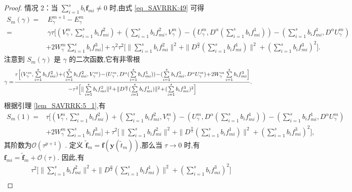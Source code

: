 \begin{proof}
情况 2：当 $\sum\limits_{i=1}^s b_i \bm{f}_{m i} \neq 0$ 时,由式 \eqref{eq_SAVRRK:49} 可得
\begin{align}\label{eq_SAVRRK:5_4a}
	S_m(\gamma)=&~E_{\gamma}^{m+1}-E_{\gamma}^{m}\nonumber\\
	=&~\gamma\tau\Big[(V_{\gamma}^{m},\sum\limits_{i=1}^{s}b_if_{mi}^2)+(\sum\limits_{i=1}^{s}b_if_{mi}^2,V_{\gamma}^{m})-(U_{\gamma}^{m},D^{\alpha} (\sum\limits_{i=1}^{s}b_if_{mi}^1))-(\sum\limits_{i=1}^{s}b_if_{mi}^1, D^{\alpha} U_{\gamma}^{m})\nonumber\\
	&+2W_{\gamma}^{m}\sum\limits_{i=1}^{s}b_if_{mi}^3\Big]+\gamma^2\tau^2\Big[\|\sum\limits_{i=1}^{s}b_if_{mi}^2\|^2+ \|D^\frac{\alpha}{2}(\sum\limits_{i=1}^{s}b_if_{mi}^1)\|^2+(\sum\limits_{i=1}^{s}b_if_{mi}^3)^2\Big].
\end{align}
注意到 $S_m(\gamma)$ 是 $\gamma$ 的二次函数,它有非零根
\begin{equation}\label{eq_SAVRRK:5_4a3}\small
	\gamma=\!\frac{\tau\Big[(V_{\gamma}^{m},\sum\limits_{i=1}^{s}b_if_{mi}^2)\!+\!(\sum\limits_{i=1}^{s}b_if_{mi}^2,V_{\gamma}^{m})\!-\!(U_{\gamma}^{m},D^{\alpha} (\sum\limits_{i=1}^{s}b_if_{mi}^1))\!-\!(\sum\limits_{i=1}^{s}b_if_{mi}^1, D^{\alpha} U_{\gamma}^{m})\!+\!2W_{\gamma}^{m}\sum\limits_{i=1}^{s}b_if_{mi}^3\Big]}{-\tau^2\Big[\|\sum\limits_{i=1}^{s}b_if_{mi}^2\|^2\!+\! \|D^\frac{\alpha}{2}(\sum\limits_{i=1}^{s}b_if_{mi}^1)\|^2\!+\!(\sum\limits_{i=1}^{s}b_if_{mi}^3)^2\Big]}.
\end{equation}
根据引理 \ref{lem_SAVRRK:5_1},有
\begin{align}\label{eq_SAVRRK:5_4a2}
	S_m(1)=&\tau\Big[(V_{\gamma}^{m},\sum\limits_{i=1}^{s}b_if_{mi}^2)+(\sum\limits_{i=1}^{s}b_if_{mi}^2,V_{\gamma}^{m})-(U_{\gamma}^{m},D^{\alpha} (\sum\limits_{i=1}^{s}b_if_{mi}^1))-(\sum\limits_{i=1}^{s}b_if_{mi}^1, D^{\alpha} U_{\gamma}^{m})\nonumber\\
	&+2W_{\gamma}^{m}\sum\limits_{i=1}^{s}b_if_{mi}^3\Big]+\tau^2\Big[\|\sum\limits_{i=1}^{s}b_if_{mi}^2\|^2+ \|D^\frac{\alpha}{2}(\sum\limits_{i=1}^{s}b_if_{mi}^1)\|^2+(\sum\limits_{i=1}^{s}b_if_{mi}^3)^2\Big],
\end{align}
其阶数为$\mathcal{O}(\tau^{p+1})$ .
定义 $\tilde{\bm{f}}_m=\bm{f}\left(\bm{y}\left(\tilde{t}_m\right)\right)$,那么当 $\tau\rightarrow 0$ 时,有 $\bm{f}_{m i}=\tilde{\bm{f}}_m+\mathcal{O}(\tau)$.
因此,有
\begin{align}\label{eq_SAVRRK:5_4a4}
	&\tau^2\Big[\|\sum\limits_{i=1}^{s}b_if_{mi}^2\|^2+ \|D^\frac{\alpha}{2}(\sum\limits_{i=1}^{s}b_if_{mi}^1)\|^2+(\sum\limits_{i=1}^{s}b_if_{mi}^3)^2\Big]\nonumber\\

\end{align}
\end{proof}
